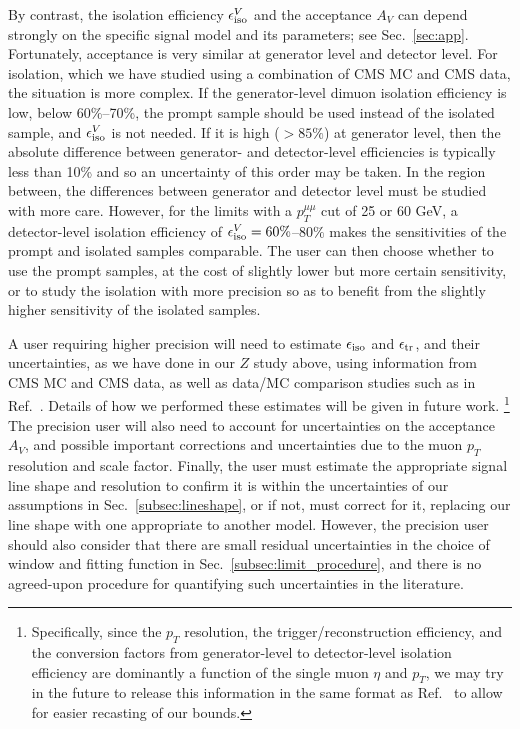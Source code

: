 \documentclass[aps,prd,twocolumn,superscriptaddress,preprintnumbers,nofootinbib,longbibliography,floatfix]{revtex4-1}
\newcommand{\ptmm}{p_T^{\mu\mu}}
\DeclareRobustCommand{\Sec}[1]{Sec.~\ref{#1}}
\DeclareRobustCommand{\Ref}[1]{Ref.~\cite{#1}}
\begin{document}
By contrast, the isolation efficiency $\epsilon^V_{\rm iso}$ and the acceptance $A_V$ can depend strongly on the specific signal model and its parameters; see \Sec{sec:app}.
%
Fortunately, acceptance is very similar at generator level and detector level.
%
For isolation, which we have studied using a combination of CMS MC and CMS data, the situation is more complex.  
%
If the generator-level dimuon isolation efficiency is low, below 60\%--70\%, the prompt sample should be used instead of the isolated sample, and  $\epsilon^V_{\rm iso}$ is not needed.  %
If it is high ($>85\%$) at generator level, then the absolute difference between generator- and detector-level efficiencies is typically less than 10\% and so an uncertainty of this order may be taken.
%
In the region between, the differences between generator and detector level must be studied with more care. 
%
However, for the limits with a $\ptmm$ cut of 25 or 60 GeV, a detector-level isolation efficiency of $\epsilon^V_{\rm iso}=60\%$--$80\%$ makes the sensitivities of the prompt and isolated samples comparable.
%
The user can then choose whether to use the prompt samples, at the cost of slightly lower but more certain sensitivity, or to study the isolation with more precision so as to benefit from the slightly higher sensitivity of the isolated samples.

A user requiring higher precision will need to estimate $\epsilon_{{\rm iso}}$ and $\epsilon_{{\rm tr}}$, and their uncertainties, as we have done in our $Z$ study above, using information from CMS MC and CMS data, as well as data/MC comparison studies such as in \Ref{Chatrchyan:2012xi}.
%
Details of how we performed these estimates will be given in future work.%
%
\footnote{Specifically, since the $p_T$ resolution, the trigger/reconstruction efficiency, and the conversion factors from generator-level to detector-level isolation efficiency are dominantly a function of the single muon $\eta$ and $p_T$, we may try in the future to release this information in the same format as \Ref{Aaij:2018xpt} to allow for easier recasting of our bounds.}
%
The precision user will also need to account for uncertainties on the acceptance $A_V$, and possible important corrections and uncertainties due to the muon $p_T$ resolution and scale factor.
%
Finally, the user must estimate the appropriate signal line shape and resolution to confirm it is within the uncertainties of our assumptions in \Sec{subsec:lineshape}, or if not, must correct for it, replacing our line shape with one appropriate to another model.
%
However, the precision user should also consider that there are small residual uncertainties in the choice of window and fitting function in \Sec{subsec:limit_procedure}, and there is no agreed-upon procedure for quantifying such uncertainties in the literature.
\end{document}
